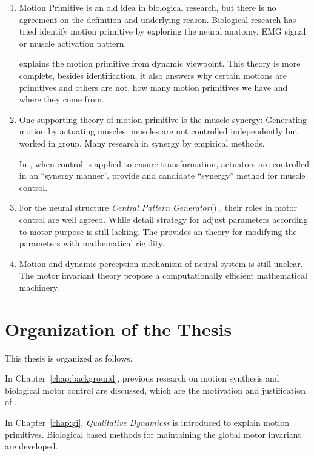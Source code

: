 \begin{enumerate}
\item 
Motion Primitive is an old idea in biological research, but there is no agreement on the definition and underlying reason.
Biological research has tried identify motion primitive by exploring the neural anatomy, EMG signal or muscle activation pattern.

\moit  explains the motion primitive from dynamic viewpoint.
This theory is more complete,
besides identification, it also answers why certain motions are primitives and others are not,
how many motion primitives we have and where they come from.

\item One supporting theory of motion primitive is the muscle synergy:
Generating motion by actuating muscles, muscles are not controlled independently but worked in group. 
Many research in synergy by empirical methods. 

In \moit, when control is applied to ensure transformation, actuators are controlled in an ``synergy manner''.
\moit provide and candidate  ``synergy'' method for muscle control.

\item For the neural structure \emph{Central Pattern Generator}(\cpg) , their roles in motor control are well agreed.
While detail strategy for adjust \cpg parameters according to motor purpose is still lacking.
The \moit provides an theory for modifying the \cpg parameters with mathematical rigidity.


\item  Motion and dynamic perception mechanism of neural system is still unclear.
The motor invariant theory propose a computationally efficient mathematical machinery.
\end{enumerate}







\section{Organization of the Thesis}

This thesis is organized as follows.
 
In Chapter~\ref{chap:background}, previous research on motion synthesis and biological motor control are discussed, which are the motivation and justification of \moit.
 
In Chapter~\ref{chap:gi}, \emph{Qualitative Dynamicss} is introduced to explain motion primitives. 
Biological based  methods for maintaining the global motor invariant are developed.

